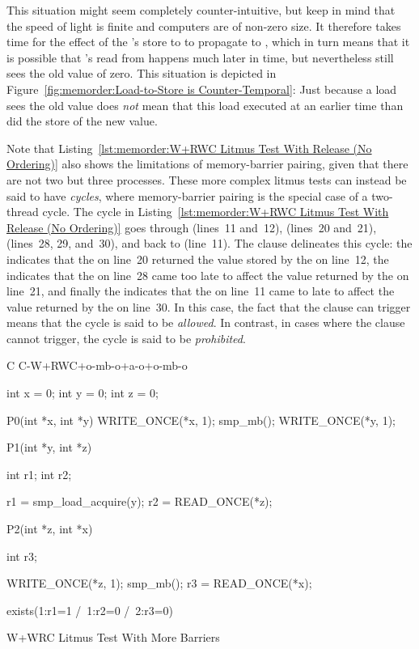 This situation might seem completely counter-intuitive, but keep
in mind that the speed of light is finite and computers are of
non-zero size.
It therefore takes time for the effect of the 's store to
 to propagate to , which in turn means that it is possible
that 's read from  happens much later in time, but
nevertheless still sees the old value of zero.
This situation is depicted in
Figure~\ref{fig:memorder:Load-to-Store is Counter-Temporal}:
Just because a load sees the old value does \emph{not} mean that
this load executed at an earlier time than did the store of the
new value.

Note that
Listing~\ref{lst:memorder:W+RWC Litmus Test With Release (No Ordering)}
also shows the limitations of memory-barrier pairing, given that
there are not two but three processes.
These more complex litmus tests can instead be said to have \emph{cycles},
where memory-barrier pairing is the special case of a two-thread cycle.
The cycle in
Listing~\ref{lst:memorder:W+RWC Litmus Test With Release (No Ordering)}
goes through  (lines~11 and~12),  (lines~20 and~21),
 (lines~28, 29, and~30), and back to  (line~11).
The  clause delineates this cycle:
the  indicates that the  on line~20
returned the value stored by the  on line~12,
the  indicates that the  on line~28 came
too late to affect the value returned by the  on line~21,
and finally the  indicates that the
 on line~11 came to late to affect the value returned
by the  on line~30.
In this case, the fact that the  clause can trigger means that
the cycle is said to be \emph{allowed}.
In contrast, in cases where the  clause cannot trigger,
the cycle is said to be \emph{prohibited}.

\begin{listing}[tbp]
{ \scriptsize
\begin{verbbox}[\LstLineNo]
C C-W+RWC+o-mb-o+a-o+o-mb-o

{
int x = 0;
int y = 0;
int z = 0;
}

P0(int *x, int *y)
{
  WRITE_ONCE(*x, 1);
  smp_mb();
  WRITE_ONCE(*y, 1);
}

P1(int *y, int *z)
{
  int r1;
  int r2;

  r1 = smp_load_acquire(y);
  r2 = READ_ONCE(*z);
}

P2(int *z, int *x)
{
  int r3;

  WRITE_ONCE(*z, 1);
  smp_mb();
  r3 = READ_ONCE(*x);
}

exists(1:r1=1 /\ 1:r2=0 /\ 2:r3=0)
\end{verbbox}
}
\centering
\theverbbox
\caption{W+WRC Litmus Test With More Barriers}
\label{lst:memorder:W+WRC Litmus Test With More Barriers}
\end{listing}

